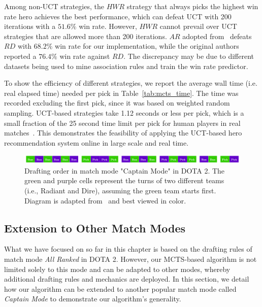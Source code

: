 Among non-UCT strategies, the $HWR$ strategy that always picks the highest win rate hero achieves the best performance, which can defeat UCT with 200 iterations with a $51.6\%$ win rate. However, $HWR$ cannot prevail over UCT strategies that are allowed more than 200 iterations. $AR$ adopted from~\textcite{hanke2017reco} defeats $RD$ with $68.2\%$ win rate for our implementation, while the original authors reported a $76.4\%$ win rate against $RD$. The discrepancy may be due to different datasets being used to mine association rules and train the win rate predictor.

To show the efficiency of different strategies, we report the average wall time (i.e. real elapsed time) needed per pick in Table~\ref{tab:mcts_time}. The time was recorded excluding the first pick, since it was based on weighted random sampling. UCT-based strategies take 1.12 seconds or less per pick, which is a small fraction of the 25 second time limit per pick for human players in real matches~\citep{dotapickorder}. This demonstrates the feasibility of applying the UCT-based hero recommendation system online in large scale and real time.


\begin{figure}
\centering
\includegraphics[width=1\textwidth]{Figures/pickorder_captain_mode_my.png}
\caption{Drafting order in match mode "Captain Mode" in DOTA 2. The green and purple cells represent the turns of two different teams (i.e., Radiant and Dire), assuming the green team starts first. Diagram is adapted from~\textcite{dotapickorder} and best viewed in color.}
\label{fig:pickorder_captain_mode}
\end{figure}

\subsection{Extension to Other Match Modes}\label{sec:draftart_extension}
What we have focused on so far in this chapter is based on the drafting rules of match mode \textit{All Ranked} in DOTA 2. However, our MCTS-based algorithm is not limited solely to this mode and can be adapted to other modes, whereby additional drafting rules and mechanics are deployed. In this section, we detail how our algorithm can be extended to another popular match mode called \textit{Captain Mode} to demonstrate our algorithm's generality. 

